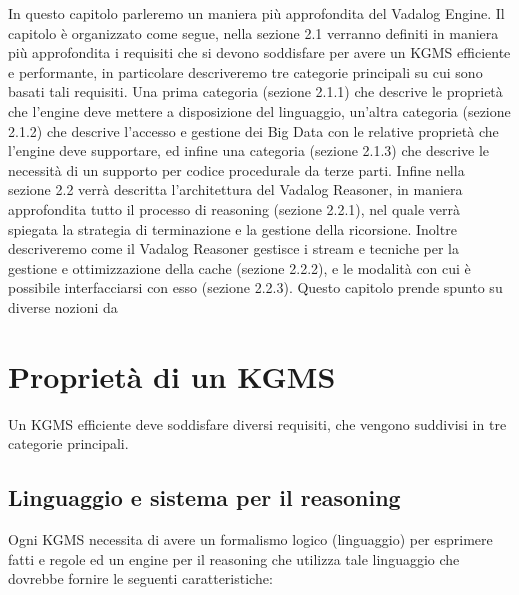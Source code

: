 In questo capitolo parleremo un maniera più approfondita del Vadalog Engine. \newline
Il capitolo è organizzato come segue, nella sezione 2.1 verranno definiti in maniera più approfondita i requisiti che si devono soddisfare per avere un KGMS efficiente e performante, in particolare descriveremo tre categorie principali su cui sono basati tali requisiti. Una prima categoria (sezione 2.1.1) che descrive le proprietà che l'engine deve mettere a disposizione del linguaggio, un'altra categoria (sezione 2.1.2) che descrive l'accesso e gestione dei Big Data con le relative proprietà che l'engine deve supportare, ed infine una categoria (sezione 2.1.3) che descrive le necessità di un supporto per codice procedurale da terze parti. \newline
Infine nella sezione 2.2 verrà descritta l'architettura del Vadalog Reasoner, in maniera approfondita tutto il processo di reasoning (sezione 2.2.1), nel quale verrà spiegata la strategia di terminazione e la gestione della ricorsione. Inoltre descriveremo come il Vadalog Reasoner gestisce i stream e tecniche per la gestione e ottimizzazione della cache (sezione 2.2.2), e le modalità con cui è possibile interfacciarsi con esso (sezione 2.2.3).
Questo capitolo prende spunto su diverse nozioni da~\cite{bellomarini2017swift}

\section{Proprietà di un KGMS}

Un KGMS efficiente deve soddisfare diversi requisiti, che vengono suddivisi in tre categorie principali.

\subsection{Linguaggio e sistema per il reasoning}

Ogni KGMS necessita di avere un formalismo logico (linguaggio) per esprimere fatti e regole ed un engine per il reasoning che utilizza tale linguaggio che dovrebbe fornire le seguenti caratteristiche:


